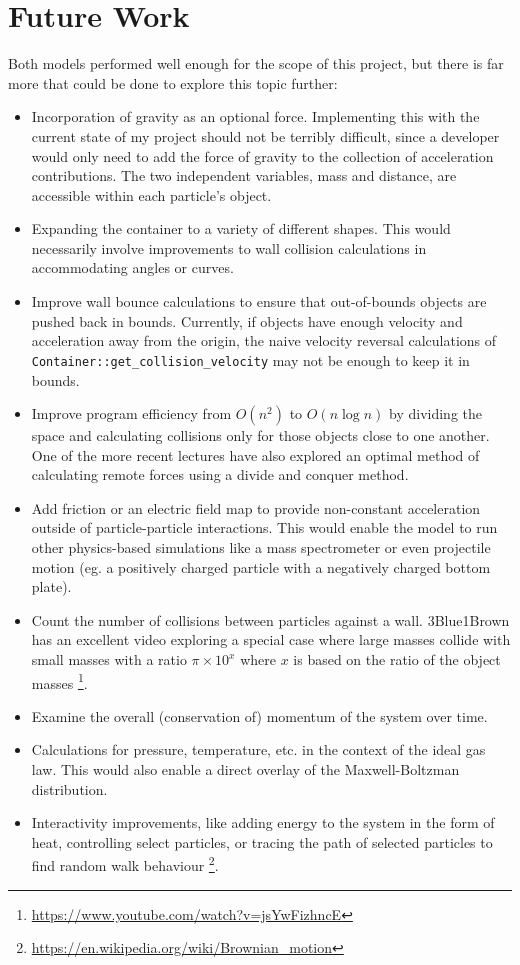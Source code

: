 \documentclass{article}
\begin{document}
\section{Future Work}
Both models performed well enough for the scope of this project,
but there is far more that could be done to explore this topic further:
\begin{itemize}
    \item Incorporation of gravity as an optional force.
    Implementing this with the current state of my project should not be terribly difficult,
    since a developer would only need to add the force of gravity to the collection of acceleration contributions.
    The two independent variables, mass and distance, are accessible within each particle's object.
    \item Expanding the container to a variety of different shapes.
    This would necessarily involve improvements to wall collision calculations in accommodating angles or curves.
    \item Improve wall bounce calculations to ensure that out-of-bounds objects are pushed back in bounds.
    Currently, if objects have enough velocity and acceleration away from the origin, the naive velocity reversal
    calculations of \texttt{Container::get\_collision\_velocity} may not be enough to keep it in bounds.
    \item Improve program efficiency from $O(n^2)$ to $O(n\log{n})$ by dividing the space
    and calculating collisions only for those objects close to one another.
    One of the more recent lectures have also explored an optimal
    method of calculating remote forces using a divide and conquer method.
    \item Add friction or an electric field map to provide non-constant acceleration outside of particle-particle interactions.
    This would enable the model to run other physics-based simulations like a mass spectrometer or even projectile motion
    (eg. a positively charged particle with a negatively charged bottom plate).
    \item Count the number of collisions between particles against a wall.
    3Blue1Brown has an excellent video exploring a special case where large
    masses collide with small masses with a ratio $\pi\times 10^x$ where $x$ is based on the ratio of the object masses
    \footnote{\url{https://www.youtube.com/watch?v=jsYwFizhncE}}.
    \item Examine the overall (conservation of) momentum of the system over time.
    \item Calculations for pressure, temperature, etc. in the context of the ideal gas law.
    This would also enable a direct overlay of the Maxwell-Boltzman distribution.
    \item Interactivity improvements, like adding energy to the system in the form of heat, controlling select particles,
    or tracing the path of selected particles to find random walk behaviour
    \footnote{\url{https://en.wikipedia.org/wiki/Brownian_motion}}.
\end{itemize}
\end{document}
